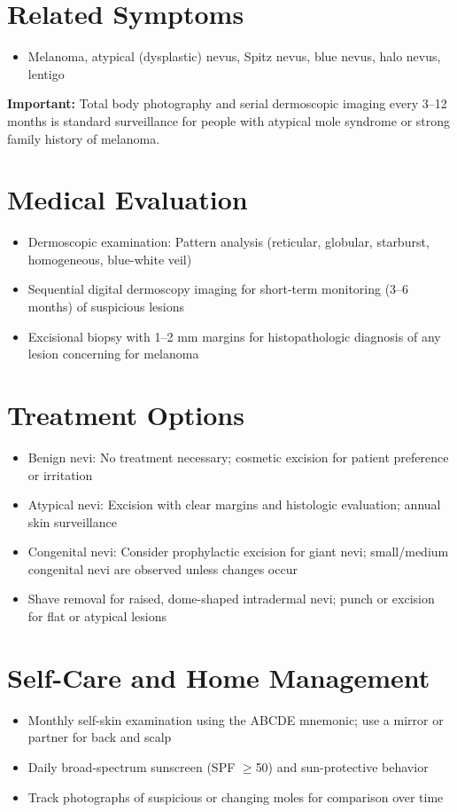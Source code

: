 \section*{Related Symptoms}
\begin{itemize}
  \item Melanoma, atypical (dysplastic) nevus, Spitz nevus, blue nevus, halo nevus, lentigo
\end{itemize}
\textbf{Important:} Total body photography and serial dermoscopic imaging every 3--12 months is standard surveillance for people with atypical mole syndrome or strong family history of melanoma.

\section*{Medical Evaluation}
\begin{itemize}
  \item Dermoscopic examination: Pattern analysis (reticular, globular, starburst, homogeneous, blue-white veil)
  \item Sequential digital dermoscopy imaging for short-term monitoring (3--6 months) of suspicious lesions
  \item Excisional biopsy with 1--2 mm margins for histopathologic diagnosis of any lesion concerning for melanoma
\end{itemize}

\section*{Treatment Options}
\begin{itemize}
  \item Benign nevi: No treatment necessary; cosmetic excision for patient preference or irritation
  \item Atypical nevi: Excision with clear margins and histologic evaluation; annual skin surveillance
  \item Congenital nevi: Consider prophylactic excision for giant nevi; small/medium congenital nevi are observed unless changes occur
  \item Shave removal for raised, dome-shaped intradermal nevi; punch or excision for flat or atypical lesions
\end{itemize}

\section*{Self-Care and Home Management}
\begin{itemize}
  \item Monthly self-skin examination using the ABCDE mnemonic; use a mirror or partner for back and scalp
  \item Daily broad-spectrum sunscreen (SPF \ensuremath{\geq}50) and sun-protective behavior
  \item Track photographs of suspicious or changing moles for comparison over time
\end{itemize}

